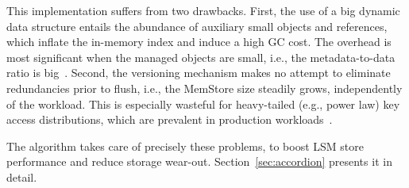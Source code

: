 This implementation suffers from two drawbacks. First, the use of a big dynamic data structure entails 
the abundance of auxiliary small objects and references, which inflate the in-memory index and induce 
a high GC cost. The overhead is most significant when the managed objects are small, i.e., 
the metadata-to-data ratio is big~\cite{Wu2015}. Second, the versioning mechanism 
makes no attempt to eliminate redundancies prior to flush, i.e., the MemStore size  steadily grows, 
independently of the workload. This is especially wasteful for heavy-tailed (e.g., power law) key access distributions, 
which are prevalent in production workloads~\cite{Devineni:2015}. 

The \sys\/ algorithm takes care of precisely these problems, to boost  
LSM store performance and reduce  storage wear-out. Section~\ref{sec:accordion} 
presents it in detail. 







